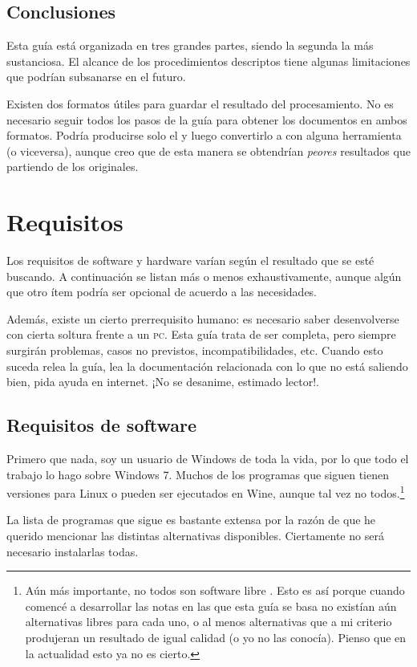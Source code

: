 \documentclass[%
	a5paper,
	10pt,
	twoside,
	openright,
	final,
]{memoir}
\begin{document}
	\section{Conclusiones} Esta guía está organizada en tres grandes partes, siendo la segunda la más sustanciosa. El alcance de los procedimientos descriptos tiene algunas limitaciones que podrían subsanarse en el futuro. 

	Existen dos formatos útiles para guardar el resultado del procesamiento. No es necesario seguir todos los pasos de la guía para obtener los documentos en ambos formatos. Podría producirse solo el \djvu y luego convertirlo a \pdf con alguna herramienta (o viceversa), aunque creo que de esta manera se obtendrían \emph{peores} resultados que partiendo de los originales.

	\chapter{Requisitos} Los requisitos de software y hardware varían según el resultado que se esté buscando. A continuación se listan más o menos exhaustivamente, aunque algún que otro ítem podría ser opcional de acuerdo a las necesidades.

	Además, existe un cierto prerrequisito humano: es necesario saber desenvolverse con cierta soltura frente a un \textsc{pc}. Esta guía trata de ser completa, pero siempre surgirán problemas, casos no previstos, incompatibilidades, etc. Cuando esto suceda relea la guía, lea la documentación relacionada con lo que no está saliendo bien, pida ayuda en internet. ¡No se desanime, estimado lector!.

	\section{Requisitos de software\label{sec:softRequirements}} Primero que nada, soy un usuario de Windows de toda la vida, por lo que todo el trabajo lo hago sobre Windows 7. Muchos de los programas que siguen tienen versiones para Linux o pueden ser ejecutados en Wine, aunque tal vez no todos.\footnote{Aún más importante, no todos son software libre \cite{WikipediaFreeSoftware}. Esto es así porque cuando comencé a desarrollar las notas en las que esta guía se basa no existían aún alternativas libres para cada uno, o al menos alternativas que a mi criterio produjeran un resultado de igual calidad (o yo no las conocía). Pienso que en la actualidad esto ya no es cierto.}

	La lista de programas que sigue es bastante extensa por la razón de que he querido mencionar las distintas alternativas disponibles. Ciertamente no será necesario instalarlas todas.
\end{document}
